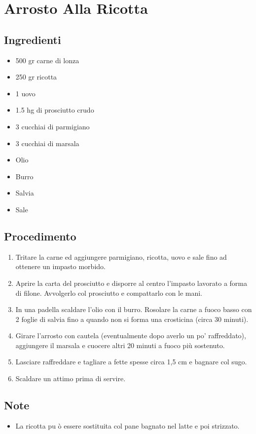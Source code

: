 \section{Arrosto Alla Ricotta}
\subsection{Ingredienti}
\begin{itemize}
\item 500 gr carne di lonza  
\item 250 gr ricotta   
\item 1 uovo  
\item 1.5 hg di prosciutto crudo  
\item 3 cucchiai di parmigiano  
\item 3 cucchiai di marsala  
\item Olio  
\item Burro  
\item Salvia  
\item Sale
\end{itemize}
\subsection{Procedimento}
\begin{enumerate}
\item  Tritare la carne ed aggiungere parmigiano, ricotta, uovo e sale fino ad ottenere un impasto morbido.  
\item  Aprire la carta del prosciutto e disporre al centro l'impasto lavorato a forma di filone. Avvolgerlo col prosciutto e compattarlo con le mani.  
\item  In una padella scaldare l'olio con il burro. Rosolare la carne a fuoco basso con 2 foglie di salvia fino a quando non si forma una crosticina (circa 30 minuti).  
\item  Girare l'arrosto con cautela (eventualmente dopo averlo un po' raffreddato), aggiungere il marsala e cuocere altri 20 minuti a fuoco più sostenuto.  
\item  Lasciare raffreddare e tagliare a fette spesse circa 1,5 cm e bagnare col sugo.  
\item  Scaldare un attimo prima di servire.
\end{enumerate}
\subsection{Note}
\begin{itemize}
\item La ricotta pu ò essere sostituita col pane bagnato nel latte e poi strizzato.
\end{itemize}
